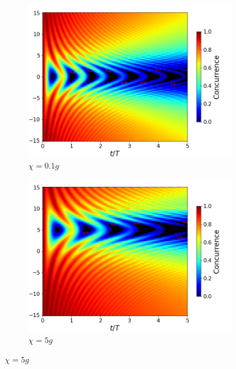 \begin{figure}[h]
    \centering
    \begin{subfigure}{0.49\textwidth}
        \includegraphics[width=\textwidth]{figuras/ch4/concu/delta/eg0+ge0 k=0.0g x=0.1g J=0.0g gamma=0.25g concu delta dis.png}
        \caption{$\chi=0.1g$}
        \label{fig4:concu detunning x1}
    \end{subfigure}
    \hfill
    \begin{subfigure}{0.49\textwidth}
        \includegraphics[width=\textwidth]{figuras/ch4/concu/delta/eg0+ge0 k=0.0g x=5.0g J=0.0g gamma=0.25g concu delta dis.png}
        \caption{$\chi=5g$}
        \label{fig4:concu detunning x2}
    \end{subfigure}

\end{figure}
